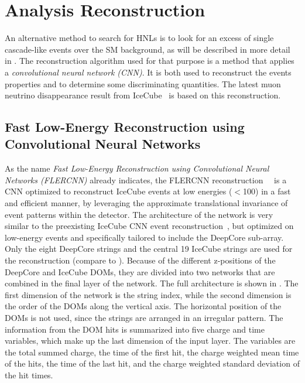 \section{Analysis Reconstruction} 

An alternative method to search for HNLs is to look for an excess of single cascade-like events over the SM background, as will be described in more detail in . The reconstruction algorithm used for that purpose is a method that applies a \textit{convolutional neural network (CNN)}. It is both used to reconstruct the events properties and to determine some discriminating quantities. The latest muon neutrino disappearance result from IceCube~ is based on this reconstruction.


\subsection{Fast Low-Energy Reconstruction using Convolutional Neural Networks} 

As the name \textit{Fast Low-Energy Reconstruction using Convolutional Neural Networks (FLERCNN)} already indicates, the FLERCNN reconstruction~~\cite{flercnn} is a CNN optimized to reconstruct IceCube events at low energies ($<$\SI{100}{\gev}) in a fast and efficient manner, by leveraging the approximate translational invariance of event patterns within the detector. The architecture of the network is very similar to the preexisting IceCube CNN event reconstruction~, but optimized on low-energy events and specifically tailored to include the DeepCore sub-array. Only the eight DeepCore strings and the central 19 IceCube strings are used for the reconstruction (compare to ). Because of the different z-positions of the DeepCore and IceCube DOMs, they are divided into two networks that are combined in the final layer of the network. The full architecture is shown in . The first dimension of the network is the string index, while the second dimension is the order of the DOMs along the vertical axis. The horizontal position of the DOMs is not used, since the strings are arranged in an irregular pattern. The information from the DOM hits is summarized into five charge and time variables, which make up the last dimension of the input layer. The variables are the total summed charge, the time of the first hit, the charge weighted mean time of the hits, the time of the last hit, and the charge weighted standard deviation of the hit times.

